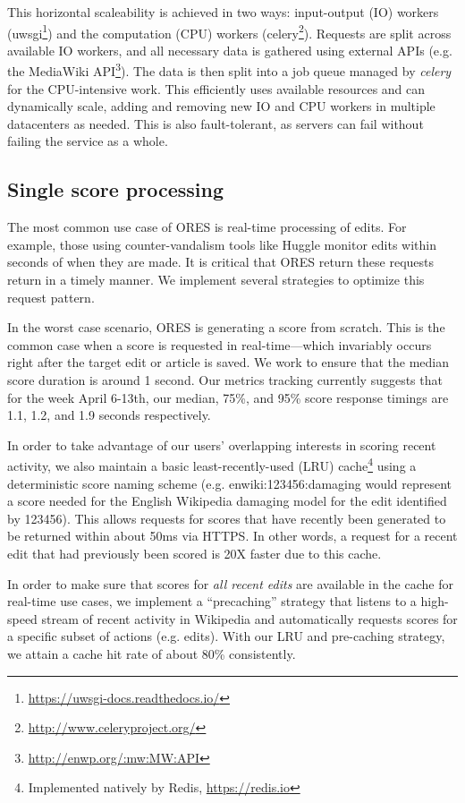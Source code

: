 This horizontal scaleability is achieved in two ways: input-output (IO) workers (uwsgi\footnote{\url{https://uwsgi-docs.readthedocs.io/}}) and the computation (CPU) workers (celery\footnote{\url{http://www.celeryproject.org/}}).  Requests are split across available IO workers, and all necessary data is gathered using external APIs (e.g. the MediaWiki API\footnote{\url{http://enwp.org/:mw:MW:API}}).  The data is then split into a job queue managed by \emph{celery} for the CPU-intensive work.  This efficiently uses available resources and can dynamically scale, adding and removing new IO and CPU workers in multiple datacenters as needed.  This is also fault-tolerant, as servers can fail without failing the service as a whole.

\subsection{Single score processing}
The most common use case of ORES is real-time processing of edits.  For example, those using counter-vandalism tools like Huggle monitor edits within seconds of when they are made.  It is critical that ORES return these requests return in a timely manner.  We implement several strategies to optimize this request pattern.

In the worst case scenario, ORES is generating a score from scratch.  This is the common case when a score is requested in real-time---which invariably occurs right after the target edit or article is saved.  We work to ensure that the median score duration is around 1 second.  Our metrics tracking currently suggests that for the week April 6-13th, our median, 75\%, and 95\% score response timings are 1.1, 1.2, and 1.9 seconds respectively.

In order to take advantage of our users' overlapping interests in scoring recent activity, we also maintain a basic least-recently-used (LRU) cache\footnote{Implemented natively by Redis, \url{https://redis.io}} using a deterministic score naming scheme (e.g. enwiki:123456:damaging would represent a score needed for the English Wikipedia damaging model for the edit identified by 123456).  This allows requests for scores that have recently been generated to be returned within about 50ms via HTTPS.  In other words, a request for a recent edit that had previously been scored is 20X faster due to this cache.

In order to make sure that scores for \emph{all recent edits} are available in the cache for real-time use cases, we implement a ``precaching'' strategy that listens to a high-speed stream of recent activity in Wikipedia and automatically requests scores for a specific subset of actions (e.g. edits).  With our LRU and pre-caching strategy, we attain a cache hit rate of about 80\% consistently.


